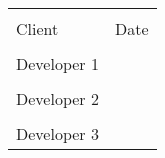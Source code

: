 \thispagestyle{empty}
	\noindent\begin{tabular}{ll}
		\makebox[2.5in]{\hrulefill} & \makebox[2.5in]{\hrulefill}\\
		Client & Date\\[8ex]%
		\makebox[2.5in]{\hrulefill}\\
		Developer 1\\[8ex]
		\makebox[2.5in]{\hrulefill}\\
		Developer 2\\[8ex]
		\makebox[2.5in]{\hrulefill}\\
		Developer 3\\[8ex]
	\end{tabular}